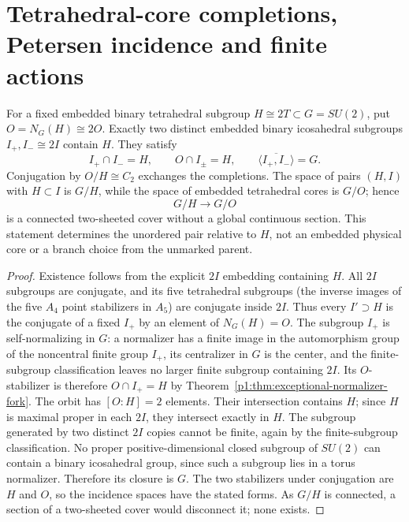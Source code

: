 \documentclass[11pt]{article}
\begin{document}
\section{Tetrahedral-core completions, Petersen incidence and finite actions}
\begin{theorem}
\label{p1:thm:v273-two-icosahedral-completions}
For a fixed embedded binary tetrahedral subgroup
$H\cong2T\subset G=SU(2)$, put $O=N_G(H)\cong2O$.
Exactly two distinct embedded binary icosahedral subgroups
$I_+,I_-\cong2I$ contain $H$. They satisfy
\[
 I_+\cap I_-=H,\qquad O\cap I_\pm=H,
 \qquad\overline{\langle I_+,I_-\rangle}=G.
\]
Conjugation by $O/H\cong C_2$ exchanges the completions. The space
of pairs $(H,I)$ with $H\subset I$ is $G/H$, while the space of
embedded tetrahedral cores is $G/O$; hence
\[
 G/H\longrightarrow G/O
\]
is a connected two-sheeted cover without a global continuous section.
This statement determines the unordered pair relative to $H$,
not an embedded physical core or a branch choice from the unmarked parent.
\end{theorem}
\begin{proof}
Existence follows from the explicit $2I$ embedding containing $H$.
All $2I$ subgroups are conjugate, and its five tetrahedral subgroups
(the inverse images of the five $A_4$ point stabilizers in $A_5$)
are conjugate inside $2I$. Thus every $I'\supset H$ is the conjugate
of a fixed $I_+$ by an element of $N_G(H)=O$.
The subgroup $I_+$ is self-normalizing in $G$: a normalizer has a
finite image in the automorphism group of the noncentral finite group
$I_+$, its centralizer in $G$ is the center, and the finite-subgroup
classification leaves no larger finite subgroup containing $2I$.
Its $O$-stabilizer is therefore $O\cap I_+=H$ by
Theorem~\ref{p1:thm:exceptional-normalizer-fork}. The orbit has
$[O:H]=2$ elements. Their intersection contains $H$; since $H$
is maximal proper in each $2I$, they intersect exactly in $H$.
The subgroup generated by two distinct $2I$ copies cannot be finite,
again by the finite-subgroup classification. No proper positive-dimensional
closed subgroup of $SU(2)$ can contain a binary icosahedral group,
since such a subgroup lies in a torus normalizer. Therefore its
closure is $G$. The two stabilizers under conjugation are $H$ and $O$,
so the incidence spaces have the stated forms. As $G/H$ is connected,
a section of a two-sheeted cover would disconnect it; none exists.
\end{proof}
\end{document}
